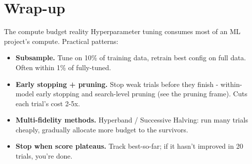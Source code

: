 \documentclass[aspectratio=169]{beamer}
\begin{document}
\section{Wrap-up}

\begin{frame}{The compute budget reality}
  Hyperparameter tuning consumes most of an ML project's compute. Practical patterns:
  \vfill
  \begin{itemize}
    \item \textbf{Subsample.} Tune on 10\% of training data, retrain best config on full data. Often within 1\% of fully-tuned.
    \item \textbf{Early stopping + pruning.} Stop weak trials before they finish - within-model early stopping and search-level pruning (see the pruning frame). Cuts each trial's cost 2-5x.
    \item \textbf{Multi-fidelity methods.} Hyperband / Successive Halving: run many trials cheaply, gradually allocate more budget to the survivors.
    \item \textbf{Stop when score plateaus.} Track best-so-far; if it hasn't improved in 20 trials, you're done.
  \end{itemize}
  \vfill
\end{frame}
\end{document}
